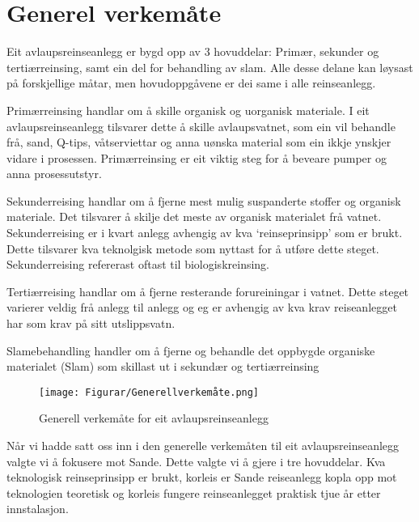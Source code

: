 \section{Generel verkemåte}

Eit avlaupsreinseanlegg er bygd opp av 3 hovuddelar: Primær, sekunder og tertiærreinsing,
samt ein del for behandling av slam.
Alle desse delane kan løysast på forskjellige måtar, men hovudoppgåvene er dei same
i alle reinseanlegg.

Primærreinsing handlar om å skille organisk og uorganisk materiale.
I eit avlaupsreinseanlegg tilsvarer dette å skille avlaupsvatnet, 
som ein vil behandle frå, sand, Q-tips, våtserviettar
og anna uønska material som ein ikkje ynskjer vidare i prosessen. \newline
Primærreinsing er eit viktig steg for å beveare pumper og anna prosessutstyr.

Sekunderreising handlar om å fjerne mest mulig suspanderte stoffer og organisk materiale.
Det tilsvarer å skilje det meste av organisk materialet frå vatnet.
Sekunderreising er i kvart anlegg avhengig av kva `reinseprinsipp' som er brukt. Dette tilsvarer
kva teknolgisk metode som nyttast for å utføre dette steget.
Sekunderreising refererast oftast til biologiskreinsing.

Tertiærreising handlar om å fjerne resterande forureiningar i vatnet.
Dette steget varierer veldig frå anlegg til anlegg og eg er
avhengig av kva krav reiseanlegget har som krav på sitt utslippsvatn.

Slamebehandling handler om å fjerne og behandle det oppbygde organiske materialet (Slam)
som skillast ut i sekundær og tertiærreinsing 

\begin{figure}[htbp]
    \centering
    \texttt{[image: Figurar/Generellverkemåte.png]}
    \caption{Generell verkemåte for eit avlaupsreinseanlegg}\label{fig:HMI}
\end{figure}

Når vi hadde satt oss inn i den generelle verkemåten til eit avlaupsreinseanlegg
valgte vi å fokusere mot Sande.
Dette valgte vi å gjere i tre hovuddelar. Kva teknologisk reinseprinsipp er brukt, korleis er Sande reiseanlegg
kopla opp mot teknologien teoretisk og korleis fungere reinseanlegget praktisk tjue år etter innstalasjon.